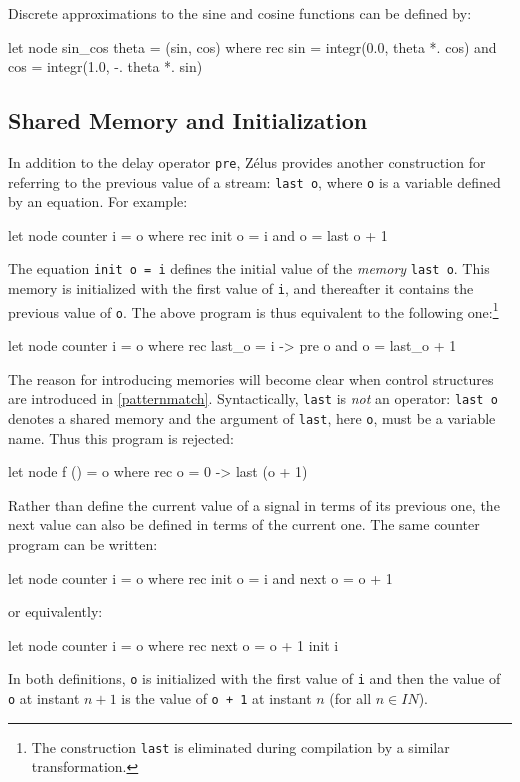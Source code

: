 \documentclass[11pt,titlepage,twoside]{report}
\makeatletter
\newcommand{\zls}[1]{{\@span{class="zelusinline"}#1}}
\newcommand{\zls}[1]{\texttt{#1}}
\renewcommand{\zls}[1]{\texttt{#1}}
\newcommand{\zelus}{{\sf Z\'elus}}
\newcommand{\Nat}{I\!\!N}
\makeatother
\begin{document}
\noindent Discrete approximations to the sine and cosine functions can be 
defined by:
\begin{chklisting}[continue,include=integr]
let node sin_cos theta = (sin, cos) where
  rec sin = integr(0.0, theta *. cos)
  and cos = integr(1.0, -. theta *. sin)
\end{chklisting}

\subsection{Shared Memory and Initialization\label{sharedinit}} %

In addition to the delay operator \zls{pre}, \zelus{} provides another 
construction for referring to the previous value of a stream: \zls{last o}, 
where \zls{o} is a variable defined by an equation. For example:%
\begin{chklisting}
let node counter i = o where
  rec init o = i
  and o = last o + 1
\end{chklisting}
The equation \zls{init o = i} defines the initial value of the \emph{memory} 
\zls{last o}. This memory is initialized with the first
value of \zls{i}, and thereafter it contains the previous value of
\zls{o}. The above program is thus equivalent to the following
one:\footnote{The construction \texttt{last} is eliminated during 
compilation by a similar transformation.}
\begin{chklisting}
let node counter i = o where
  rec last_o = i -> pre o
  and o = last_o + 1
\end{chklisting}
The reason for introducing memories will become clear when control 
structures are introduced in \cref{patternmatch}.
Syntactically, \zls{last} is {\em not} an operator: \zls{last o} denotes
a shared memory and the argument of \zls{last}, here \zls{o}, must be a 
variable name. Thus this program is rejected:
\begin{chklisting}
let node f () = o where
  rec o = 0 -> last (o + 1)
\end{chklisting}

Rather than define the current value of a signal in terms of its previous
one, the next value can also be defined in terms of the current one.
The same counter program can be written:
\begin{chklisting}
let node counter i = o where
  rec init o = i
  and next o = o + 1
\end{chklisting}
or equivalently:
\begin{chklisting}
let node counter i = o where
  rec next o = o + 1 init i
\end{chklisting}
In both definitions, \zls{o} is initialized with the first value of
\zls{i} and then the value of \texttt{o} at instant $n+1$ is the value of
\zls{o + 1} at instant $n$ (for all $n \in \Nat$).
\end{document}
